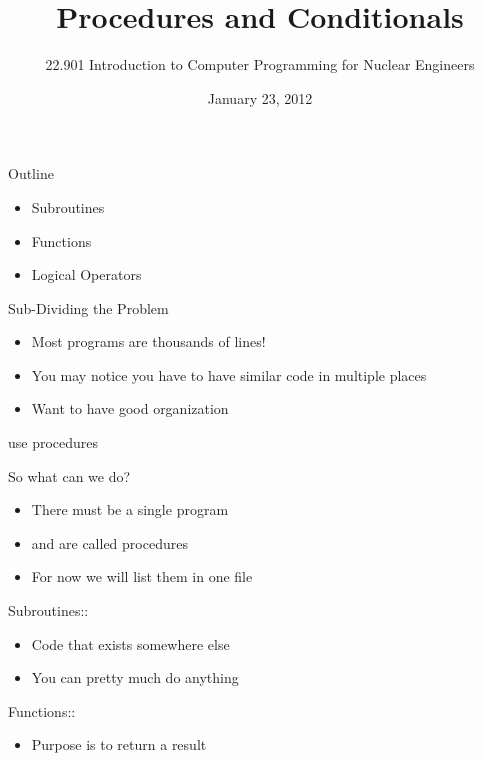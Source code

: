 \documentclass{beamer}
\title[]{Procedures and Conditionals}
\author[]{22.901 Introduction to Computer Programming for Nuclear Engineers}
\institute[\insertpagenumber]{}
\date{January 23, 2012}
\begin{document}

\frame{\titlepage}

\begin{frame}{Outline}
  \begin{itemize}
    \item Subroutines
    \vfill\item Functions
    \vfill\item Logical Operators
  \end{itemize}
\end{frame}
\begin{frame}{Sub-Dividing the Problem}

  \begin{itemize}
    \vfill\item Most programs are \alert{thousands} of lines!
    \vfill\item You may notice you have to have similar code in multiple places
    \vfill\item Want to have good organization
  \end{itemize}
  \begin{center}
    \vfill{\huge\color{blue} use procedures}
  \end{center}

\end{frame}
\begin{frame}{So what can we do?}

  \begin{itemize}
    \item There must be a single {\color{blue}{main}} program
    \vfill\item {\color{blue}{Subroutines}} and {\color{blue}{functions}} are called procedures
    \vfill\item For now we will list them in one file
  \end{itemize}
  \vfill
  Subroutines::
  \begin{itemize}
    \item Code that exists somewhere else
    \item You can pretty much do anything
  \end{itemize}
  \vfill
  Functions::
  \begin{itemize}
    \item Purpose is to return a result 
  \end{itemize}
\end{frame}
\end{document}
